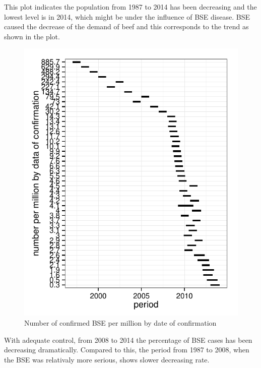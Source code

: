 \documentclass{article}\usepackage[]{graphicx}\usepackage[]{color}
\newenvironment{knitrout}{}{} %
\begin{document}
This plot indicates the population from 1987 to 2014 has been decreasing and the lowest level is in 2014, which might be under the influence of BSE disease. BSE caused the decrease of the demand of beef and this corresponds to the trend as shown in the plot.
\begin{knitrout}\footnotesize
{}\color{fgcolor}\begin{figure}[H]

\includegraphics[width=\textwidth]{figure/percent} \caption[Number of confirmed BSE per million by date of confirmation]{Number of confirmed BSE per million by date of confirmation\label{fig:percent}}
\end{figure}


\end{knitrout}

With adequate control, from 2008 to 2014 the percentage of BSE cases has been decreasing dramatically. Compared to this, the period from 1987 to 2008, when the BSE was relativaly more serious, shows slower decreasing rate.
\end{document}
